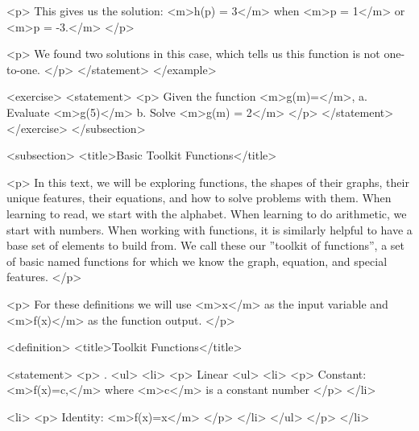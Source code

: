                 <p>
                    This gives us the solution: <m>h(p) = 3</m> when <m>p = 1</m> or <m>p = -3.</m>
                </p>

                <p>
                    We found two solutions in this case, which tells us this function is not one-to-one.
                </p>
            </statement>
        </example>

        <exercise>
            <statement>
                <p>
                    Given the function <m>g(m)=</m>, a.
                    Evaluate <m>g(5)</m> b.
                    Solve <m>g(m) = 2</m>
                </p>
            </statement>
        </exercise>
    </subsection>


    <subsection>
        <title>Basic Toolkit Functions</title>

        <p>
            In this text, we will be exploring functions, the shapes of their graphs, their unique features, their equations, and how to solve problems with them.
            When learning to read, we start with the alphabet.
            When learning to do arithmetic, we start with numbers.
            When working with functions, it is similarly helpful to have a base set of elements to build from.
            We call these our ”toolkit of functions”, a set of basic named functions for which we know the graph, equation, and special features.
        </p>

        <p>
            For these definitions we will use <m>x</m> as the input variable and <m>f(x)</m> as the function output.
        </p>

        <definition>
            <title>Toolkit Functions</title>

            <statement>
                <p>
                    .
                    <ul>
                        <li>
                            <p>
                                Linear
                                <ul>
                                    <li>
                                        <p>
                                            Constant: <m>f(x)=c,</m> where <m>c</m> is a constant number
                                        </p>
                                    </li>

                                    <li>
                                        <p>
                                            Identity: <m>f(x)=x</m>
                                        </p>
                                    </li>
                                </ul>
                            </p>
                        </li>

